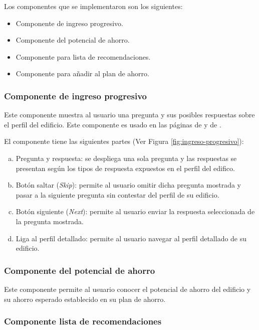 Los componentes que se implementaron son los siguientes:
\begin{itemize}
\item Componente de ingreso progresivo.
\item Componente del potencial de ahorro.
\item Componente para lista de recomendaciones.
\item Componente para añadir al plan de ahorro.
\end{itemize}

\subsubsection{Componente de ingreso progresivo}

Este componente muestra al usuario una pregunta y sus posibles respuestas sobre el
perfil del edificio. Este componente es usado en las páginas de
 y de .

El componente tiene las siguientes partes (Ver Figura \ref{fig:ingreso-progresivo}):
\begin{enumerate}[a)]
\item Pregunta y respuesta: se despliega una sola pregunta y
  las respuestas se presentan según los tipos de respuesta expuestos
  en el perfil del edifico.
\item Botón saltar (\textit{Skip}): permite al usuario omitir dicha pregunta
  mostrada y pasar a la siguiente pregunta sin contestar del perfil
  de su edificio.
\item Botón siguiente (\textit{Next}): permite al usuario enviar la respuesta
  seleccionada de la pregunta mostrada.
\item Liga al perfil detallado: permite al usuario navegar al perfil
  detallado de su edificio.
\end{enumerate}

\subsubsection{Componente del potencial de ahorro}

Este componente permite al usuario conocer el potencial de ahorro del edificio y su
ahorro esperado establecido en su plan de ahorro.

\subsubsection{Componente lista de recomendaciones}

